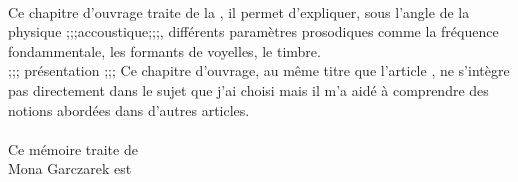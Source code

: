 \cite{DiC13}\\
      Ce chapitre d'ouvrage traite de la , il permet d'expliquer, sous l'angle de la physique ;;;accoustique;;;, différents paramètres prosodiques comme la fréquence fondammentale, les formants de voyelles, le timbre.\\
      ;;; présentation ;;;
      Ce chapitre d'ouvrage, au même titre que l'article \cite{Can15}, ne s'intègre pas directement dans le sujet que j'ai choisi mais il m'a aidé à comprendre des notions abordées dans d'autres articles.\\

\cite{Gar22}\\
      Ce mémoire traite de \\
      Mona Garczarek est \\

\printbibliography
